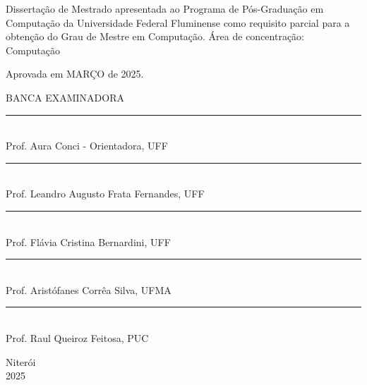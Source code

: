 \noindent
\begin{flushright}
\begin{minipage}[t]{8cm}

Dissertação de Mestrado apresentada ao Programa de P\'{o}s-Gradua\c{c}\~{a}o em Computa\c{c}\~{a}o da Universidade Federal Fluminense como requisito parcial para a obten\c{c}\~{a}o do \mbox{Grau} de Mestre em Computa\c{c}\~{a}o. \'{A}rea de concentra\c{c}\~{a}o: \mbox{Computa\c{c}\~{a}o} %

\end{minipage}
\end{flushright}
\vspace{1.0 cm}
\noindent
Aprovada em MARÇO de 2025. \\
\begin{flushright}
  {
  \begin{center}
  BANCA EXAMINADORA \\
  \vspace{6mm}
  \rule{11cm}{.1mm} \\
    Prof. Aura Conci - Orientadora, UFF \\
    \vspace{6mm}
  \rule{11cm}{.1mm} \\
    Prof. Leandro Augusto Frata Fernandes, UFF\\
    \vspace{6mm}
  \rule{11cm}{.1mm} \\
    Prof. Flávia Cristina Bernardini, UFF\\
  \vspace{4mm}
  \rule{11cm}{.1mm} \\
    Prof. Aristófanes Corrêa Silva, UFMA\\
    \vspace{6mm}
  \rule{11cm}{.1mm} \\
    Prof. Raul Queiroz Feitosa, PUC\\
  \vspace{6mm}
  \end{center}
  }
\end{flushright}
\begin{center}
  \vspace{4mm}
  Niter\'{o}i \\
  2025

\end{center}

\cleardoublepage
\thispagestyle{empty}
\vspace*{200mm}


